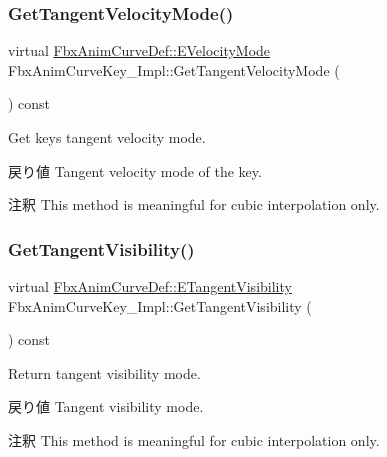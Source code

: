 \subsubsection{\texorpdfstring{Get\+Tangent\+Velocity\+Mode()}{GetTangentVelocityMode()}}
{\footnotesize\ttfamily virtual \hyperlink{class_fbx_anim_curve_def_a747576beffa78ab236d2e140da395fff}{Fbx\+Anim\+Curve\+Def\+::\+E\+Velocity\+Mode} Fbx\+Anim\+Curve\+Key\+\_\+\+Impl\+::\+Get\+Tangent\+Velocity\+Mode (\begin{DoxyParamCaption}{ }\end{DoxyParamCaption}) const\hspace{0.3cm}{\ttfamily [pure virtual]}}

Get key\textquotesingle{}s tangent velocity mode. \begin{DoxyReturn}{戻り値}
Tangent velocity mode of the key. 
\end{DoxyReturn}
\begin{DoxyRemark}{注釈}
This method is meaningful for cubic interpolation only. 
\end{DoxyRemark}
\mbox{\label{class_fbx_anim_curve_key___impl_afc01debb2c6e0130c80640c201578c3e}} 
\subsubsection{\texorpdfstring{Get\+Tangent\+Visibility()}{GetTangentVisibility()}}
{\footnotesize\ttfamily virtual \hyperlink{class_fbx_anim_curve_def_a70c49072776ac6b3426c57dd80e16e3b}{Fbx\+Anim\+Curve\+Def\+::\+E\+Tangent\+Visibility} Fbx\+Anim\+Curve\+Key\+\_\+\+Impl\+::\+Get\+Tangent\+Visibility (\begin{DoxyParamCaption}{ }\end{DoxyParamCaption}) const\hspace{0.3cm}{\ttfamily [pure virtual]}}

Return tangent visibility mode. \begin{DoxyReturn}{戻り値}
Tangent visibility mode. 
\end{DoxyReturn}
\begin{DoxyRemark}{注釈}
This method is meaningful for cubic interpolation only. 
\end{DoxyRemark}
\mbox{\label{class_fbx_anim_curve_key___impl_a78b901f289d94aafab0b8256c2a865e2}} 
